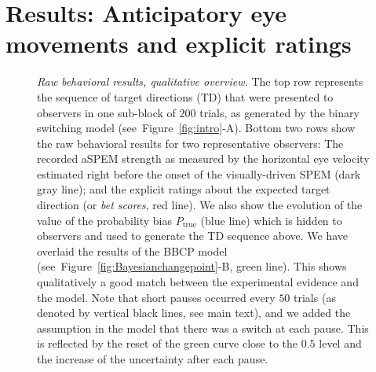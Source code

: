 \documentclass[12pt,english]{article}%
\newcommand{\seeFig}[1]{Figure~\ref{fig:#1}}
\begin{document}
\section{Results: Anticipatory eye movements and explicit ratings}
\label{sec:results_psycho}
\begin{figure}%
\caption{
\emph{Raw behavioral results, qualitative overview.} %
The top row represents the sequence of target directions (TD)
that were presented to observers
in one sub-block of $200$ trials,
as generated by the binary switching model (see~\seeFig{intro}-A).
Bottom two rows show the raw behavioral results
for two representative observers:
The recorded aSPEM strength as measured
by the horizontal eye velocity estimated right before
the onset of the visually-driven SPEM (dark gray line);
and the explicit ratings about the expected target direction (or \textit{bet scores}, red line).
We also show the evolution of the value
of the probability bias $P_{\text{true}}$ (blue line)
which is hidden to observers
and used to generate the TD sequence above.
We have overlaid the results of the BBCP model
(see~\seeFig{Bayesianchangepoint}-B, green line).
This shows qualitatively a good match between
the experimental evidence and the model.
Note that short pauses occurred every $50$ trials 
(as denoted by vertical black lines, see main text), 
and we added the assumption in the model
that there was a switch at each pause. 
This is reflected by the reset of the green curve close to the $0.5$ level and 
the increase of the uncertainty after each pause. %
}
\label{fig:results_psycho}
\end{figure}
\end{document}

